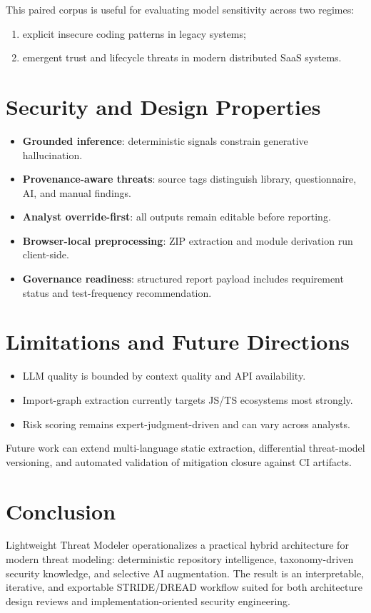 \documentclass[12pt,a4paper]{article}
\begin{document}
This paired corpus is useful for evaluating model sensitivity across two regimes:
\begin{enumerate}
    \item explicit insecure coding patterns in legacy systems;
    \item emergent trust and lifecycle threats in modern distributed SaaS systems.
\end{enumerate}

\section{Security and Design Properties}
\begin{itemize}
    \item \textbf{Grounded inference}: deterministic signals constrain generative hallucination.
    \item \textbf{Provenance-aware threats}: source tags distinguish library, questionnaire, AI, and manual findings.
    \item \textbf{Analyst override-first}: all outputs remain editable before reporting.
    \item \textbf{Browser-local preprocessing}: ZIP extraction and module derivation run client-side.
    \item \textbf{Governance readiness}: structured report payload includes requirement status and test-frequency recommendation.
\end{itemize}

\section{Limitations and Future Directions}
\begin{itemize}
    \item LLM quality is bounded by context quality and API availability.
    \item Import-graph extraction currently targets JS/TS ecosystems most strongly.
    \item Risk scoring remains expert-judgment-driven and can vary across analysts.
\end{itemize}

Future work can extend multi-language static extraction, differential threat-model versioning, and automated validation of mitigation closure against CI artifacts.

\section{Conclusion}
Lightweight Threat Modeler operationalizes a practical hybrid architecture for modern threat modeling: deterministic repository intelligence, taxonomy-driven security knowledge, and selective AI augmentation. The result is an interpretable, iterative, and exportable STRIDE/DREAD workflow suited for both architecture design reviews and implementation-oriented security engineering.
\end{document}
